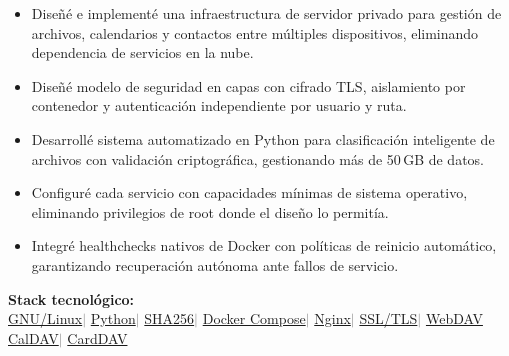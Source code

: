 \documentclass{article}
\begin{document}
\begin{itemize}
  \item Diseñé e implementé una infraestructura de servidor privado para gestión
        de archivos, calendarios y contactos entre múltiples dispositivos,
        eliminando dependencia de servicios en la nube.
  \item Diseñé modelo de seguridad en capas con cifrado TLS, aislamiento por
        contenedor y autenticación independiente por usuario y ruta.
  \item Desarrollé sistema automatizado en Python para clasificación inteligente
        de archivos con validación criptográfica, gestionando más de 50\,GB de datos.
  \item Configuré cada servicio con capacidades mínimas de sistema operativo,
        eliminando privilegios de root donde el diseño lo permitía.
  \item Integré healthchecks nativos de Docker con políticas de reinicio
        automático, garantizando recuperación autónoma ante fallos de servicio.
\end{itemize}

\medskip
\noindent\textbf{Stack tecnológico:}\enspace \\[0.3cm]
\faLinux\;\small{\href{https://linuxmint.com/edition.php?id=326}{GNU/Linux}}\normalsize\quad\textcolor{gray}{$|$}\quad
\faPython\;\small{\href{https://www.python.org/}{Python}}\normalsize\quad\textcolor{gray}{$|$}\quad
\faFileArchive\;\small{\href{https://docs.python.org/3/library/hashlib.html}{SHA\text{-}256}}\normalsize\quad\textcolor{gray}{$|$}\quad
\faDocker\;\small{\href{https://docs.docker.com/compose}{Docker Compose}}\normalsize\quad\textcolor{gray}{$|$}\quad
\faServer\;\small{\href{https://github.com/nginx/docker-nginx}{Nginx}}\normalsize\quad\textcolor{gray}{$|$}\quad
\faKey\;\small{\href{https://github.com/nginx/docker-nginx}{SSL/TLS}}\normalsize\quad\textcolor{gray}{$|$}\quad
\faNetworkWired\;\small{\href{https://github.com/mar10/wsgidav}{WebDAV}}\normalsize\quad \\[0.2cm]
\faCalendar*\;\small{\href{https://github.com/tomsquest/docker-radicale}{CalDAV}}\normalsize\quad\textcolor{gray}{$|$}\quad
\faAddressBook\;\small{\href{https://github.com/tomsquest/docker-radicale}{CardDAV}}\normalsize\quad
\end{document}
